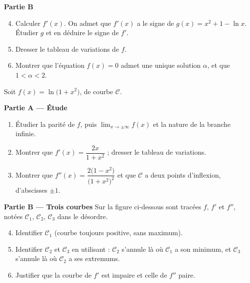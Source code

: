 \textbf{Partie B}
\begin{enumerate}
	\setcounter{enumi}{3}
	\item Calculer $f'(x)$. On admet que $f'(x)$ a le signe de
	$g(x)=x^{2}+1-\ln x$. Étudier $g$ et en déduire le signe de $f'$.
	\item Dresser le tableau de variations de $f$.
	\item Montrer que l'équation $f(x)=0$ admet une unique solution
	$\alpha$, et que $1<\alpha<2$.
\end{enumerate}

Soit $f(x)=\ln\bigl(1+x^{2}\bigr)$, de courbe $\mathcal C$.

\textbf{Partie A — Étude}
\begin{enumerate}
	\item Étudier la parité de $f$, puis $\displaystyle\lim_{x\to\pm\infty}f(x)$
	et la nature de la branche infinie.
	\item Montrer que $f'(x)=\dfrac{2x}{1+x^{2}}$ ; dresser le tableau de
	variations.
	\item Montrer que $f''(x)=\dfrac{2\bigl(1-x^{2}\bigr)}{\bigl(1+x^{2}\bigr)^{2}}$
	et que $\mathcal C$ a deux points d'inflexion, d'abscisses $\pm 1$.
\end{enumerate}

\textbf{Partie B — Trois courbes}
Sur la figure ci-dessous sont tracées $f$, $f'$ et $f''$, notées
$\mathcal C_1$, $\mathcal C_2$, $\mathcal C_3$ dans le désordre.

\begin{center}
\end{center}

\begin{enumerate}
	\setcounter{enumi}{3}
	\item Identifier $\mathcal C_1$ (courbe toujours positive, sans maximum).
	\item Identifier $\mathcal C_2$ et $\mathcal C_3$ en utilisant : $\mathcal C_2$
	s'annule là où $\mathcal C_1$ a son minimum, et $\mathcal C_3$ s'annule là où
	$\mathcal C_2$ a ses extremums.
	\item Justifier que la courbe de $f'$ est impaire et celle de $f''$ paire.
\end{enumerate}

